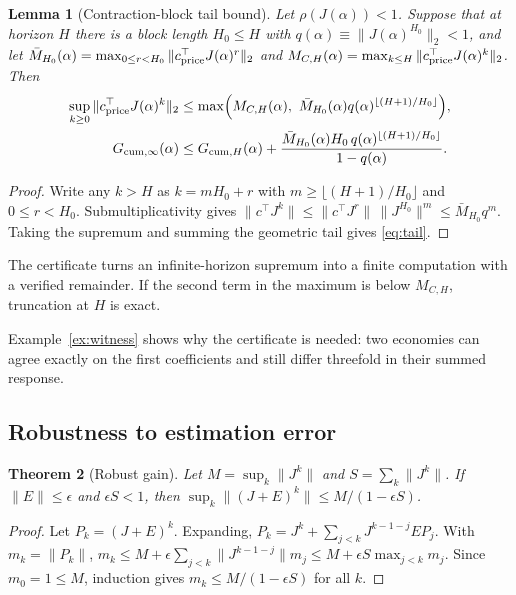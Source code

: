\documentclass[12pt]{article}
\newtheorem{theorem}{Theorem}[section]
\newtheorem{lemma}[theorem]{Lemma}
\theoremstyle{definition}
\theoremstyle{remark}
\begin{document}
\begin{lemma}[Contraction-block tail bound]\label{lem:tail}
Let $\rho(J(\alpha))<1$. Suppose that at horizon $H$ there is a block length $H_0\le H$ with $q(\alpha)\equiv\|J(\alpha)^{H_0}\|_2<1$, and let $\bar M_{H_0}(\alpha)=\max_{0\le r<H_0}\|c^\top_{\rm price}J(\alpha)^r\|_2$ and $M_{C,H}(\alpha)=\max_{k\le H}\|c^\top_{\rm price}J(\alpha)^k\|_2$. Then
\begin{align}
\sup_{k\ge0}\|c^\top_{\rm price}J(\alpha)^k\|_2&\le\max\Bigl(M_{C,H}(\alpha),\ \bar M_{H_0}(\alpha)q(\alpha)^{\lfloor(H+1)/H_0\rfloor}\Bigr),\label{eq:tail}\\
G_{{\rm cum},\infty}(\alpha)&\le G_{{\rm cum},H}(\alpha)+\frac{\bar M_{H_0}(\alpha)H_0\,q(\alpha)^{\lfloor(H+1)/H_0\rfloor}}{1-q(\alpha)}.\notag
\end{align}
\end{lemma}

\begin{proof}
Write any $k>H$ as $k=mH_0+r$ with $m\ge\lfloor(H+1)/H_0\rfloor$ and $0\le r<H_0$. Submultiplicativity gives $\|c^\top J^k\|\le\|c^\top J^r\|\,\|J^{H_0}\|^m\le\bar M_{H_0}q^m$. Taking the supremum and summing the geometric tail gives \eqref{eq:tail}.
\end{proof}

The certificate turns an infinite-horizon supremum into a finite computation with a verified remainder. If the second term in the maximum is below $M_{C,H}$, truncation at $H$ is exact.

Example~\ref{ex:witness} shows why the certificate is needed: two economies can agree exactly on the first coefficients and still differ threefold in their summed response.

\subsection{Robustness to estimation error}

\begin{theorem}[Robust gain]\label{thm:robust}
Let $M=\sup_k\|J^k\|$ and $S=\sum_k\|J^k\|$. If $\|E\|\le\epsilon$ and $\epsilon S<1$, then $\sup_k\|(J+E)^k\|\le M/(1-\epsilon S)$.
\end{theorem}

\begin{proof}
Let $P_k=(J+E)^k$. Expanding, $P_k=J^k+\sum_{j<k}J^{k-1-j}EP_j$. With $m_k=\|P_k\|$, $m_k\le M+\epsilon\sum_{j<k}\|J^{k-1-j}\|m_j\le M+\epsilon S\max_{j<k}m_j$. Since $m_0=1\le M$, induction gives $m_k\le M/(1-\epsilon S)$ for all $k$.
\end{proof}
\end{document}

